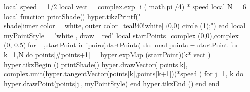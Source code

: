 \documentclass[margin=.2cm,multi,tikz]{standalone}
\begin{document}
\begin{luacode*}
local speed = 1/2
local vect = complex.exp_i ( math.pi /4) * speed
local N = 6
local function printShade()
	hyper.tikzPrintf("\\shade[inner color = white, outer color=teal!40!white] (0,0) circle (1);")
end
local myPointStyle = "white , draw =red"
local startPoints={complex (0,0),complex (0,-0.5)}
for _,startPoint in ipairs(startPoints) do
	local points = {startPoint}
	for k=1,N do
		points[#points+1] = hyper.expMap (startPoint)(k* vect )
		hyper.tikzBegin ()
		printShade()
		 hyper.drawVector(
			points[k],
			complex.unit(hyper.tangentVector(points[k],points[k+1]))*speed
		)
		for j=1, k do
			hyper.drawPoint(points[j], myPointStyle)
		end
		hyper.tikzEnd ()
	end
end

\end{luacode*}
\end{document}
